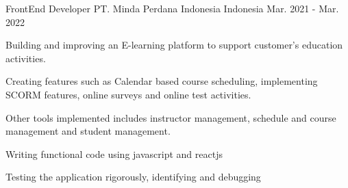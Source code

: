 \begin{cventries}
  \cventry
    {FrontEnd Developer} %
    {PT. Minda Perdana Indonesia} %
    {Indonesia} %
    {Mar. 2021 - Mar. 2022} %
    {
      \begin{cvitems} %
        \item { Building and improving an E-learning platform to support customer’s education activities. }
        \\
        \item { Creating features such as Calendar based course scheduling, implementing SCORM features, online surveys and online test activities.}
        \\
        \item { Other tools implemented includes instructor management, schedule and course management and student management. }
        \\
        \item { Writing functional code using javascript and reactjs }
        \\
        \item { Testing the application rigorously, identifying and debugging }
      \end{cvitems}
    }

\end{cventries}
